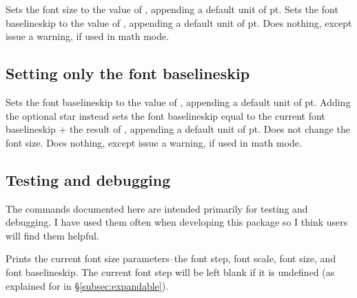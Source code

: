 \documentclass{beery}
\begin{document}
\begin{mydisplaycode}
    
\end{mydisplaycode}

Sets the font size to the value of , appending a default unit of \unit{pt}.
Sets the font baselineskip to the value of , appending a default unit of \unit{pt}.
Does nothing, except issue a warning, if used in math mode.

\subsection{Setting only the font baselineskip}
\label{subsec:setfontbaselineskip}

\begin{mydisplaycode}
   \sarg{} 
\end{mydisplaycode}

Sets the font baselineskip to the value of , appending a default unit of \unit{pt}.
Adding the optional star instead sets the font baselineskip equal to the current font baselineskip + the result of , appending a default unit of \unit{pt}.
Does not change the font size.
Does nothing, except issue a warning, if used in math mode.

\subsection{Testing and debugging}
\label{subsec:debug}

The commands documented here are intended primarily for testing and debugging.
I have used them often when developing this package so I think users will find them helpful.

\begin{mydisplaycode}
\end{mydisplaycode}

Prints the current font size parameters\---the font step, font scale, font size, and font baselineskip.
The current font step will be left blank if it is undefined (as explained for  in \S\ref{subsec:expandable}).
\pagebreak%

\begin{mydisplaycode}
\end{mydisplaycode}
\end{document}
